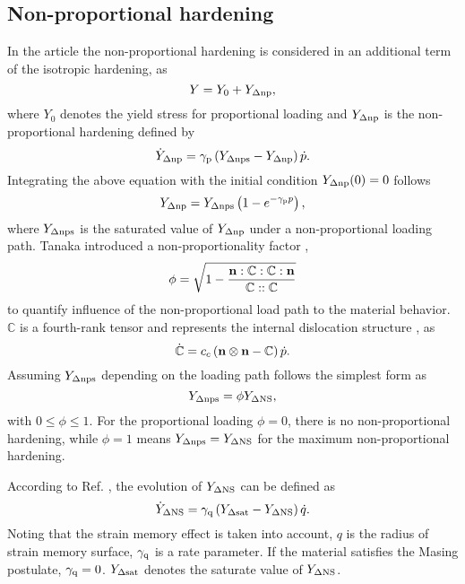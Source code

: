 \documentclass[preprint,5p,twocolumn,11pt,sort&compress]{elsarticle}
\newcommand{\bfn}{{\bf n}}
\begin{document}
\subsection{Non-proportional hardening}
\noindent
In the article the non-proportional hardening is considered in an additional term of the isotropic hardening, as
\begin{equation}
Y = {Y_0} + {Y_{\Delta \rm np}},
\end{equation}
where $Y_0$ denotes the yield stress for proportional loading and ${Y_{\Delta \rm np}}$ is the non-proportional hardening defined by
\begin{equation}
{\dot Y_{\Delta \rm np}} = {\gamma _{\rm p}}\left( {{Y_{\rm \Delta nps}} - {Y_{\Delta \rm np}}} \right)\dot p.
\end{equation}
Integrating the above equation with the initial condition ${Y_{\Delta \rm np}}(0)=0$ follows
\begin{equation}
{Y_{\Delta \rm np}} = Y_{\rm \Delta nps}\left( 1-e^{- \gamma_{\rm p} p} \right),
\end{equation}
where $Y_{\rm \Delta nps}$ is the saturated value of ${Y_{\Delta \rm np}}$ under a non-proportional loading path.
Tanaka introduced a non-proportionality factor \cite{tanaka1994nonproportionality},
\begin{equation}
\phi  = \sqrt {1 - \frac{{\bfn:\mathbb{C}:\mathbb{C}:\bfn}}{{\mathbb{C}::\mathbb{C}}}}
\end{equation}
to quantify influence of the non-proportional load path to the material behavior.  $\mathbb{C}$ is a fourth-rank tensor and represents the internal dislocation structure \cite{tanaka1994nonproportionality}, as
\begin{equation}
\dot {\mathbb{C}} = {c_c}\left( {\bfn \otimes \bfn - \mathbb{C}} \right)\dot p.
\end{equation}
Assuming ${Y_{\rm \Delta nps}}$ depending on the loading path follows the simplest form as
\begin{equation}
{Y_{\rm \Delta nps}} = \phi {Y_{\Delta \rm NS}},
\end{equation}
with $0 \leq \phi \leq 1$.
For the proportional loading $\phi = 0$, there is no non-proportional hardening, while $\phi = 1$ means ${Y_{\rm \Delta nps}} = {Y_{\Delta \rm NS}}$ for the maximum non-proportional hardening.

According to Ref. \cite{fang2015cyclic}, the evolution of ${Y_{\Delta \rm NS}}$ can be defined as
\begin{equation}
{\dot Y_{\Delta \rm NS}} = {\gamma _{\rm q}}\left( {{Y_{\Delta \rm sat}} - {Y_{\Delta \rm NS}}} \right)\dot q.
\end{equation}
Noting that the strain memory effect is taken into account, $q$ is the radius of strain memory surface, ${\gamma _{\rm q}}$ is a rate parameter.
If the material satisfies the Masing postulate,  ${\gamma _{\rm q}}=0$. $Y_{\Delta \rm sat} $ denotes the saturate value of $Y_{\Delta \rm NS}$.
\end{document}
